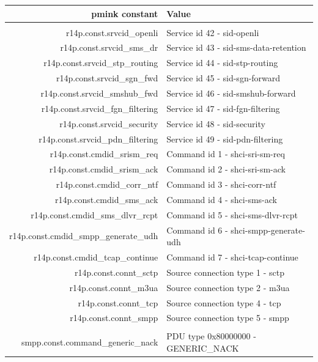 \documentclass[a4paper,latin]{paper}
\begin{document}
\noindent
\begin{tabularx}{\linewidth}{ | >{\ttfamily} r | >{\ttfamily} X |}
	\hline	
	\acrshort{pmink} constant			& Value \\
	\hline
	\rowcolor{blue!10}
	\multicolumn{2}{| l |}{\acrfull{r14p}} 	\\
	\hline
	r14p.const.srvcid\_openli			& Service id 42 - sid-openli\\
	r14p.const.srvcid\_sms\_dr			& Service id 43 - sid-sms-data-retention\\
	r14p.const.srvcid\_stp\_routing			& Service id 44 - sid-stp-routing\\
	r14p.const.srvcid\_sgn\_fwd			& Service id 45 - sid-sgn-forward\\
	r14p.const.srvcid\_smshub\_fwd			& Service id 46 - sid-smshub-forward\\
	r14p.const.srvcid\_fgn\_filtering		& Service id 47 - sid-fgn-filtering\\
	r14p.const.srvcid\_security			& Service id 48 - sid-security\\
	r14p.const.srvcid\_pdn\_filtering		& Service id 49 - sid-pdn-filtering\\	
	r14p.const.cmdid\_srism\_req			& Command id 1 - shci-sri-sm-req\\
	r14p.const.cmdid\_srism\_ack			& Command id 2 - shci-sri-sm-ack\\
	r14p.const.cmdid\_corr\_ntf			& Command id 3 - shci-corr-ntf\\
	r14p.const.cmdid\_sms\_ack			& Command id 4 - shci-sms-ack\\
	r14p.const.cmdid\_sms\_dlvr\_rcpt		& Command id 5 - shci-sms-dlvr-rcpt\\
	r14p.const.cmdid\_smpp\_generate\_udh		& Command id 6 - shci-smpp-generate-udh\\
	r14p.const.cmdid\_tcap\_continue		& Command id 7 - shci-tcap-continue\\
	r14p.const.connt\_sctp				& Source connection type 1 - \acrshort{sctp}\\
	r14p.const.connt\_m3ua				& Source connection type 2 - \acrshort{m3ua}\\
	r14p.const.connt\_tcp				& Source connection type 4 - \acrshort{tcp}\\
	r14p.const.connt\_smpp				& Source connection type 5 - \acrshort{smpp}\\
	\hline
	\rowcolor{blue!10}
	\multicolumn{2}{| l |}{\acrfull{smpp}} 	\\
	\hline
	smpp.const.command\_generic\_nack		& PDU type 0x80000000 - GENERIC\_NACK\\

\end{tabularx}
\end{document}
